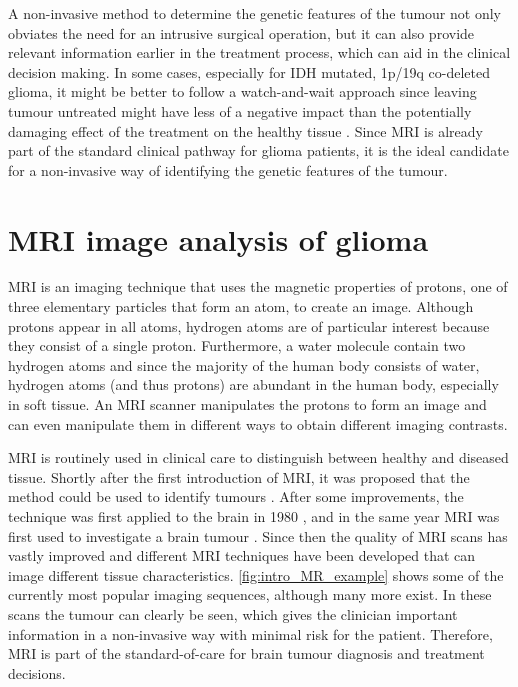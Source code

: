 A non-invasive method to determine the genetic features of the tumour not only obviates the need for an intrusive surgical operation, but it can also provide relevant information earlier in the treatment process, which can aid in the clinical decision making.
In some cases, especially for IDH mutated, 1p/19q co-deleted glioma, it might be better to follow a watch-and-wait approach since leaving tumour untreated might have less of a negative impact than the potentially damaging effect of the treatment on the healthy tissue \autocite{vandenbent2012lggtreatment, welle2017EANO}.
Since \gls{MRI} is already part of the standard clinical pathway for glioma patients, it is the ideal candidate for a non-invasive way of identifying the genetic features of the tumour.

\section{MRI image analysis of glioma}

\gls{MRI} is an imaging technique that uses the magnetic properties of protons, one of three elementary particles that form an atom, to create an image.
Although protons appear in all atoms, hydrogen atoms are of particular interest because they consist of a single proton.
Furthermore, a water molecule contain two hydrogen atoms and since the majority of the human body consists of water, hydrogen atoms (and thus protons) are abundant in the human body, especially in soft tissue.
An \gls{MRI} scanner manipulates the protons to form an image and can even manipulate them in different ways to obtain different imaging contrasts.

\gls{MRI} is routinely used in clinical care to distinguish between healthy and diseased tissue.
Shortly after the first introduction of \gls{MRI}, it was proposed that the method could be used to identify tumours \autocite{damadian1971tumour}.
After some improvements, the technique was first applied to the brain in 1980 \autocite{holland1980brain}, and in the same year MRI was first used to investigate a brain tumour \autocite{hawkes1980NMRbrain}.
Since then the quality of \gls{MRI} scans has vastly improved and different \gls{MRI} techniques have been developed that can image different tissue characteristics.
\cref{fig:intro_MR_example} shows some of the currently most popular imaging sequences, although many more exist.
In these scans the tumour can clearly be seen, which gives the clinician important information in a non-invasive way with minimal risk for the patient.
Therefore, \gls{MRI} is part of the standard-of-care for brain tumour diagnosis and treatment decisions.

